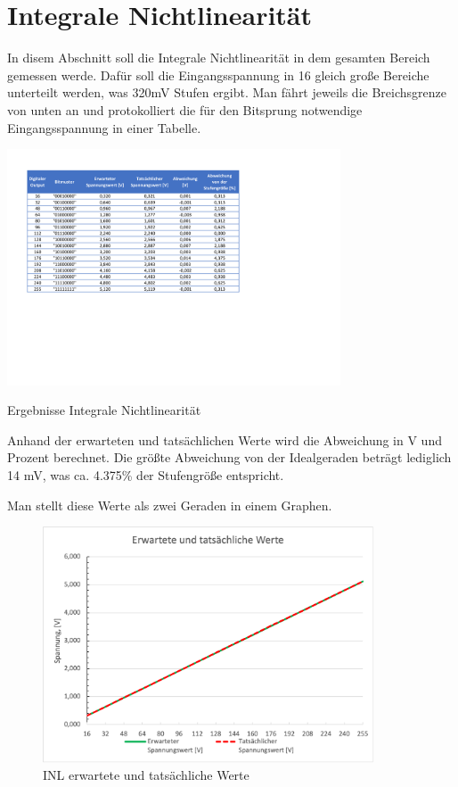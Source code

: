 \section{Integrale Nichtlinearität}

In disem Abschnitt soll die Integrale Nichtlinearität in dem gesamten Bereich gemessen
werde. Dafür soll die Eingangsspannung in 16 gleich große Bereiche unterteilt werden, was 
320mV Stufen ergibt. Man fährt jeweils die Breichsgrenze von unten an und protokolliert 
die für den Bitsprung notwendige Eingangsspannung in einer Tabelle.


\begin{table}[H]
	\centering
	\includegraphics[height=7cm]{images/Versuch1d.pdf} 
	\caption{Ergebnisse Integrale Nichtlinearität}
	\label{fig: Ergebnisse Integrale Nichtlinearität}
\end{table}

Anhand der erwarteten und tatsächlichen Werte wird die Abweichung in V und Prozent
berechnet. Die größte Abweichung von der Idealgeraden beträgt lediglich 14 mV, 
was ca. 4.375\% der Stufengröße entspricht. \par

Man stellt diese Werte als zwei Geraden in einem Graphen.

\begin{figure}[H]
	\centering
	\includegraphics[height=7cm]{images/INL_gerade.png} 
	\caption{\acs{INL} erwartete und tatsächliche Werte}
	\label{fig: INL erwartete und tatsächliche Werte}
\end{figure}

